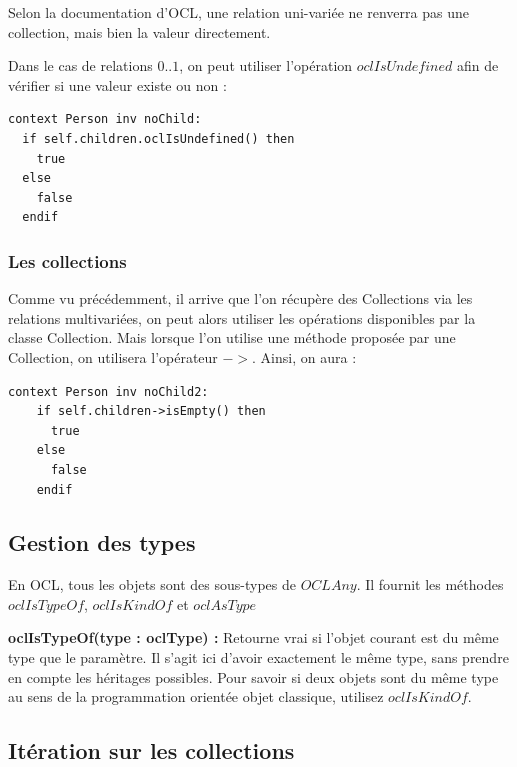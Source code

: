 \documentclass[../Syllabus.tex]{subfiles}
\begin{document}
\begin{warningblock}
  Selon la documentation d'OCL, une relation uni-variée ne renverra pas une collection, mais bien la valeur directement.
\end{warningblock}

Dans le cas de relations $0 .. 1$, on peut utiliser l'opération $oclIsUndefined$ afin de vérifier si une valeur existe ou non : 

\begin{lstlisting}[language=OCL]
  context Person inv noChild:
  if self.children.oclIsUndefined() then
    true
  else
    false
  endif
\end{lstlisting}

\subsubsection{Les collections}

Comme vu précédemment, il arrive que l'on récupère des Collections via les relations multivariées, on peut alors utiliser les opérations disponibles par la classe Collection. Mais lorsque l'on utilise une méthode proposée par une Collection, on utilisera l'opérateur $->$. Ainsi, on aura :

\begin{lstlisting}[language=OCL]
  context Person inv noChild2:
    if self.children->isEmpty() then
      true
    else
      false
    endif
\end{lstlisting}

\subsection{Gestion des types}

En OCL, tous les objets sont des sous-types de $OCLAny$. Il fournit les méthodes $oclIsTypeOf$, $oclIsKindOf$ et $oclAsType$

\vspace{0.3cm}

\noindent\textbf{oclIsTypeOf(type : oclType) :} Retourne vrai si l'objet courant est du même type que le paramètre. Il s'agit ici d'avoir exactement le même type, sans prendre en compte les héritages possibles. Pour savoir si deux objets sont du même type au sens de la programmation orientée objet classique, utilisez $oclIsKindOf$.

\subsection{Itération sur les collections}
\end{document}
